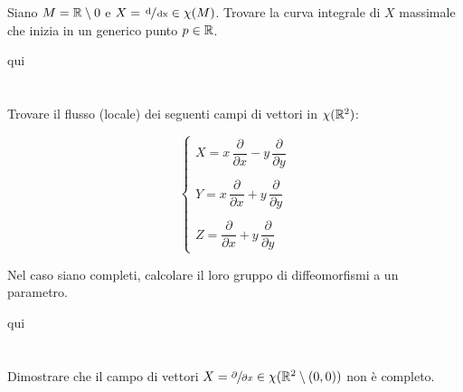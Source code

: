 %

\newpage

%

\section{}\label{es2-29}

\begin{tcolorbox}
	Siano $ M = \mathbb{R} \setminus 0 $ e $ X = \sfrac{\operatorname{d}}{\operatorname{dx}} \in \chi(M) $. Trovare la curva integrale di $ X $ massimale che inizia in un generico punto $ p \in \mathbb{R} $.
\end{tcolorbox}

qui

%

\newpage

%

\section{}\label{es2-30}

\begin{tcolorbox}
	Trovare il flusso (locale) dei seguenti campi di vettori in $ \chi(\mathbb{R}^{2}) $:
	
	\begin{equation}
		\begin{cases}
			X = x \, \dfrac{\partial}{\partial x} - y \, \dfrac{\partial}{\partial y}\\\\
			Y = x \, \dfrac{\partial}{\partial x} + y \, \dfrac{\partial}{\partial y}\\\\
			Z = \dfrac{\partial}{\partial x} + y \, \dfrac{\partial}{\partial y}
		\end{cases}
	\end{equation}
	
	Nel caso siano completi, calcolare il loro gruppo di diffeomorfismi a un parametro.
\end{tcolorbox}

qui

%

\newpage

%

\section{}\label{es2-31}

\begin{tcolorbox}
	Dimostrare che il campo di vettori $ X = \sfrac{\partial}{\partial x} \in \chi(\mathbb{R}^{2} \setminus (0,0)) $ non è completo.
\end{tcolorbox}

